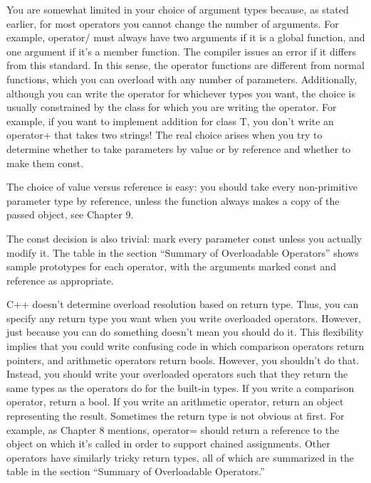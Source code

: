 You are somewhat limited in your choice of argument types because, as stated earlier, for most operators you cannot change the number of arguments. For example, operator/ must always have two arguments if it is a global function, and one argument if it’s a member function. The compiler issues an error if it differs from this standard. In this sense, the operator functions are different from normal functions, which you can overload with any number of parameters. Additionally, although you can write the operator for whichever types you want, the choice is usually constrained by the class for which you are writing the operator. For example, if you want to implement addition for class T, you don’t write an operator+ that takes two strings! The real choice arises when you try to determine whether to take parameters by value or by reference and whether to make them const.

The choice of value versus reference is easy: you should take every non-primitive parameter type by reference, unless the function always makes a copy of the passed object, see Chapter 9.

The const decision is also trivial: mark every parameter const unless you actually modify it. The table in the section “Summary of Overloadable Operators” shows sample prototypes for each operator, with the arguments marked const and reference as appropriate.


C++ doesn’t determine overload resolution based on return type. Thus, you can specify any return type you want when you write overloaded operators. However, just because you can do something doesn’t mean you should do it. This flexibility implies that you could write confusing code in which comparison operators return pointers, and arithmetic operators return bools. However, you shouldn’t do that. Instead, you should write your overloaded operators such that they return the same types as the operators do for the built-in types. If you write a comparison operator, return a bool. If you write an arithmetic operator, return an object representing the result. Sometimes the return type is not obvious at first. For example, as Chapter 8 mentions, operator= should return a reference to the object on which it’s called in order to support chained assignments. Other operators have similarly tricky return types, all of which are summarized in the table in the section “Summary of Overloadable Operators.”

